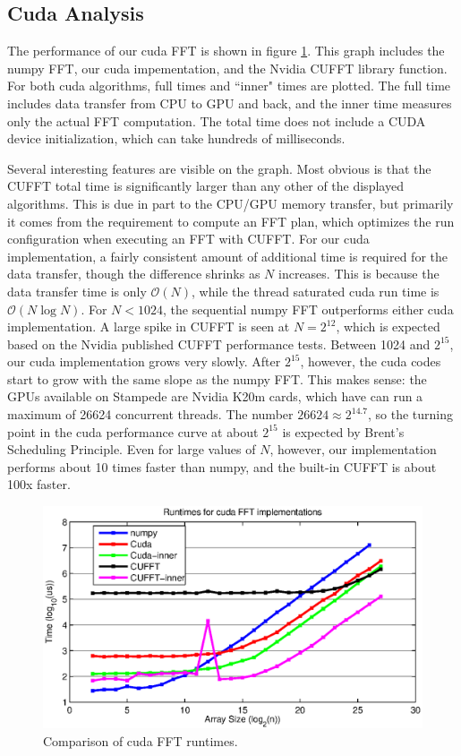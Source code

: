 \subsection{Cuda Analysis}
The performance of our cuda FFT is shown in figure \ref{cudaRuntimes}. This graph includes the numpy FFT, our cuda impementation, and the Nvidia CUFFT library function. For both cuda algorithms, full times and ``inner" times are plotted. The full time includes data transfer from CPU to GPU and back, and the inner time measures only the actual FFT computation. The total time does not include a CUDA device initialization, which can take hundreds of milliseconds.

Several interesting features are visible on the graph. Most obvious is that the CUFFT total time is significantly larger than any other of the displayed algorithms. This is due in part to the CPU/GPU memory transfer, but primarily it comes from the requirement to compute an FFT plan, which optimizes the run configuration when executing an FFT with CUFFT. For our cuda implementation, a fairly consistent amount of additional time is required for the data transfer, though the difference shrinks as $N$ increases. This is because the data transfer time is only $\mathcal{O}(N)$, while the thread saturated cuda run time is $\mathcal{O}(N\log N)$. For $N<1024$, the sequential numpy FFT outperforms either cuda implementation. A large spike in CUFFT is seen at $N=2^{12}$, which is expected based on the Nvidia published CUFFT performance tests. Between 1024 and $2^{15}$, our cuda implementation grows very slowly. After $2^{15}$, however, the cuda codes start to grow with the same slope as the numpy FFT. This makes sense: the GPUs available on Stampede are Nvidia K20m cards, which have can run a maximum of 26624 concurrent threads. The number $26624 \approx 2^{14.7}$, so the turning point in the cuda performance curve at about $2^{15}$ is expected by Brent's Scheduling Principle. Even for large values of $N$, however, our implementation performs about 10 times faster than numpy, and the built-in CUFFT is about 100x faster.

\begin{figure}
    \centering
    \includegraphics[scale=0.75]{img/cudaRuntimes.eps}
    \caption{Comparison of cuda FFT runtimes.}
    \label{cudaRuntimes}
\end{figure}